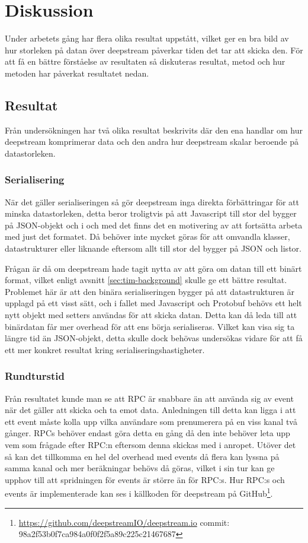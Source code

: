 \section{Diskussion}
\label{sec:tim-discussion}
Under arbetets gång har flera olika resultat uppstått, vilket ger en bra bild av hur storleken på datan över deepstream påverkar tiden det tar att skicka den. För att få en bättre förståelse av resultaten så diskuteras resultat, metod och hur metoden har påverkat resultatet nedan. 

\subsection{Resultat}
\label{subsec:tim-discussion-results}
Från undersökningen har två olika resultat beskrivits där den ena handlar om hur deepstream komprimerar data och den andra hur deepstream skalar beroende på datastorleken.

\subsubsection{Serialisering}
När det gäller serialiseringen så gör deepstream inga direkta förbättringar för att minska datastorleken, detta beror troligtvis på att Javascript till stor del bygger på JSON-objekt och i och med det finns det en motivering av att fortsätta arbeta med just det formatet. Då behöver inte mycket göras för att omvandla klasser, datastrukturer eller liknande eftersom allt till stor del bygger på JSON och listor.

Frågan är då om deepstream hade tagit nytta av att göra om datan till ett binärt format, vilket enligt avsnitt \ref{sec:tim-background} skulle ge ett bättre resultat. Problemet här är att den binära serialiseringen bygger på att datastrukturen är upplagd på ett visst sätt, och i fallet med Javascript och Protobuf behövs ett helt nytt objekt med setters användas för att skicka datan. Detta kan då leda till att binärdatan får mer overhead för att ens börja serialiseras. Vilket kan visa sig ta längre tid än JSON-objekt, detta skulle dock behövas undersökas vidare för att få ett mer konkret resultat kring serialiseringshastigheter.

\subsubsection{Rundturstid}
Från resultatet kunde man se att RPC är snabbare än att använda sig av event när det gäller att skicka och ta emot data. Anledningen till detta kan ligga i att ett event måste kolla upp vilka användare som prenumerera på en viss kanal två gånger. RPCs behöver endast göra detta en gång då den inte behöver leta upp vem som frågade efter RPC:n eftersom denna skickas med i anropet. Utöver det så kan det tillkomma en hel del overhead med events då flera kan lyssna på samma kanal och mer beräkningar behövs då göras, vilket i sin tur kan ge upphov till att spridningen för events är större än för RPC:s. Hur RPC:s och events är implementerade kan ses i källkoden för deepstream på GitHub\footnote{\url{https://github.com/deepstreamIO/deepstream.io} \newline commit: 98a2f53b0f7ca984a0f0f2f5a89c225c21467687}. 


